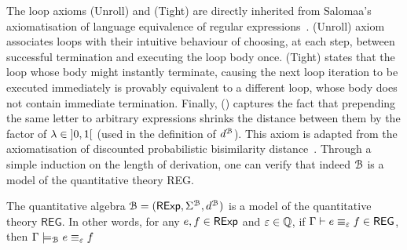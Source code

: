 The loop axioms \textsf{(Unroll)} and \textsf{(Tight)} are directly inherited from Salomaa's axiomatisation of language equivalence of regular expressions~\cite{Salomaa:1966:Two}. \textsf{(Unroll)} axiom associates loops with their intuitive behaviour of choosing, at each step, between successful termination and executing the loop body once. \textsf{(Tight)} states that the loop whose body might instantly terminate, causing the next loop iteration to be executed immediately is provably equivalent to a different loop, whose body does not contain immediate termination. 
Finally, \textsf{(\dPref)} captures the fact that prepending the same letter to arbitrary expressions shrinks the distance between them by the factor of $\lambda \in \interval[open]{0}{1}$ (used in the definition of $d^{\mathcal{B}}$). This axiom is adapted from the axiomatisation of discounted probabilistic bisimilarity distance~\cite{Bacci:2018:Bisimilarity}.
Through a simple induction on the length of derivation, one can verify that indeed $\mathcal{B}$ is a model of the quantitative theory \textsf{REG}. 
\begin{theorem}[Soundness]\label{c2:thm:soundness}
    The quantitative algebra $\mathcal{B} = (\mathsf{RExp}, \Sigma^{\mathcal{B}}, d^{\mathcal{B}})$ is a model of the quantitative theory $\mathsf{REG}$. In other words, for any $e, f \in \mathsf{RExp}$ and $\varepsilon \in \mathbb{Q}$, if $\Gamma \vdash e \equiv_\varepsilon f \in \mathsf{REG}$, then $\Gamma \models_{\mathcal{B}} e \equiv_\varepsilon f$
\end{theorem}
